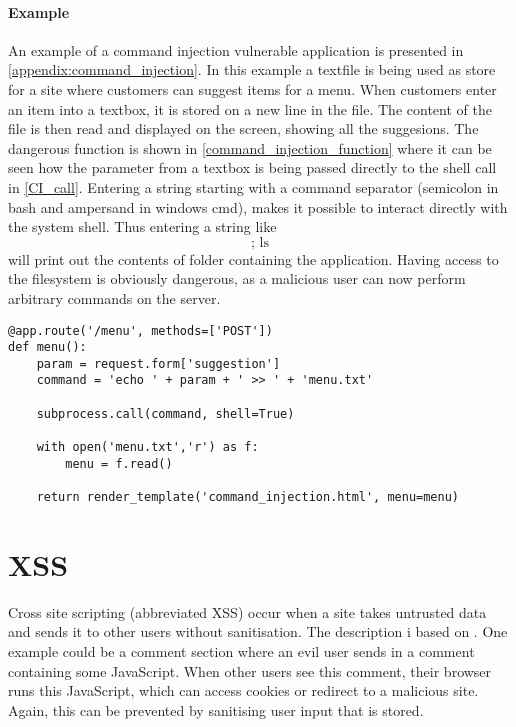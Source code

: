 \paragraph{Example}
An example of a command injection vulnerable application is presented in \cref{appendix:command_injection}.
In this example a textfile is being used as store for a site where customers can suggest items for a menu.
When customers enter an item into a textbox, it is stored on a new line in the file.
The content of the file is then read and displayed on the screen, showing all the suggesions.
The dangerous function is shown in \cref{command_injection_function} where it can be seen how the parameter from a textbox is being passed directly to the shell call in \cref{CI_call}.
Entering a string starting with a command separator (semicolon in bash and ampersand in windows cmd), makes it possible to interact directly with the system shell.
Thus entering a string like
\[ \text{; ls} \]
will print out the contents of folder containing the application.
Having access to the filesystem is obviously dangerous, as a malicious user can now perform arbitrary commands on the server.

\begin{lstlisting}[style=python, caption={The culprit making command injection possible. Param is not being escaped before being executed by the shell.}, label={command_injection_function}, firstnumber=13]
@app.route('/menu', methods=['POST'])
def menu():
    param = request.form['suggestion']
    command = 'echo ' + param + ' >> ' + 'menu.txt'

    subprocess.call(command, shell=True)

    with open('menu.txt','r') as f:
        menu = f.read()

    return render_template('command_injection.html', menu=menu)

\end{lstlisting}

\section{XSS}\label{vulnerabilities:xss}
Cross site scripting (abbreviated XSS) occur when a site takes untrusted data and sends it to other users without sanitisation.
The description i based on \citet{crosssitescripting}.
One example could be a comment section where an evil user sends in a comment containing some JavaScript.
When other users see this comment, their browser runs this JavaScript, which can access cookies or redirect to a malicious site.
Again, this can be prevented by sanitising user input that is stored.

